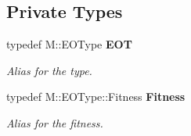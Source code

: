 \subsection*{Private Types}
\begin{CompactItemize}
\item 
typedef M::EOType {\bf EOT}\label{classmo_t_s_move_loop_expl_y0}

\begin{CompactList}\small\item\em Alias for the type. \item\end{CompactList}\item 
typedef M::EOType::Fitness {\bf Fitness}\label{classmo_t_s_move_loop_expl_y1}

\begin{CompactList}\small\item\em Alias for the fitness. \item\end{CompactList}\end{CompactItemize}
